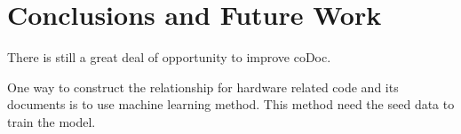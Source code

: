 \documentclass[11pt,letterpaper,oneside]{article}
\begin{document}
\section{Conclusions and Future Work}
\label{sec:conclusion}
There is still a great deal of opportunity to improve coDoc.

One way to construct the relationship for hardware related code and its documents is to use machine learning method.
This method need the seed data to train the model.





\end{document}

